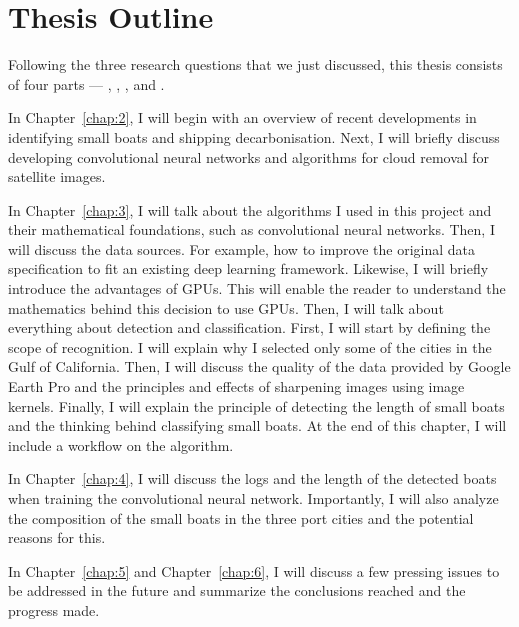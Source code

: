 \newpage
\section{Thesis Outline}
Following the three research questions that we just discussed, this thesis consists of four parts --- , , , and .

\begin{description}
    \item In Chapter~\ref{chap:2}, I will begin with an overview of recent developments in identifying small boats and shipping decarbonisation. Next, I will briefly discuss developing convolutional neural networks and algorithms for cloud removal for satellite images.

    \item In Chapter~\ref{chap:3}, I will talk about the algorithms I used in this project and their mathematical foundations, such as convolutional neural networks. Then, I will discuss the data sources. For example, how to improve the original data specification to fit an existing deep learning framework. Likewise, I will briefly introduce the advantages of GPUs. This will enable the reader to understand the mathematics behind this decision to use GPUs. Then, I will talk about everything about detection and classification. First, I will start by defining the scope of recognition. I will explain why I selected only some of the cities in the Gulf of California. Then, I will discuss the quality of the data provided by Google Earth Pro and the principles and effects of sharpening images using image kernels. Finally, I will explain the principle of detecting the length of small boats and the thinking behind classifying small boats. At the end of this chapter, I will include a workflow on the algorithm.
    
    \item In Chapter~\ref{chap:4}, I will discuss the logs and the length of the detected boats when training the convolutional neural network. Importantly, I will also analyze the composition of the small boats in the three port cities and the potential reasons for this.
    
    \item In Chapter~\ref{chap:5} and Chapter~\ref{chap:6}, I will discuss a few pressing issues to be addressed in the future and summarize the conclusions reached and the progress made.
\end{description}


